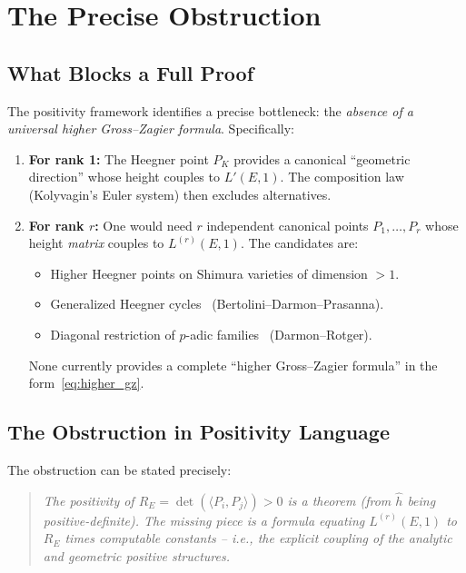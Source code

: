 \documentclass[aps,prd,twocolumn,superscriptaddress,nofootinbib,floatfix]{revtex4-2}
\theoremstyle{definition}
\theoremstyle{remark}
\begin{document}
\clearpage
\section{The Precise Obstruction}
\label{sec:obstruction}

\subsection{What Blocks a Full Proof}

The positivity framework identifies a precise bottleneck: the \textit{absence of a universal higher Gross--Zagier formula}. Specifically:

\begin{enumerate}
\item \textbf{For rank 1:} The Heegner point $P_K$ provides a canonical ``geometric direction'' whose height couples to $L'(E,1)$. The composition law (Kolyvagin's Euler system) then excludes alternatives.

\item \textbf{For rank $r$:} One would need $r$ independent canonical points $P_1, \ldots, P_r$ whose height \textit{matrix} couples to $L^{(r)}(E,1)$. The candidates are:
\begin{itemize}
\item Higher Heegner points on Shimura varieties of dimension $> 1$.
\item Generalized Heegner cycles~\cite{BDP2013} (Bertolini--Darmon--Prasanna).
\item Diagonal restriction of $p$-adic families~\cite{DarmonRotger2017} (Darmon--Rotger).
\end{itemize}
None currently provides a complete ``higher Gross--Zagier formula'' in the form~\eqref{eq:higher_gz}.
\end{enumerate}

\subsection{The Obstruction in Positivity Language}

The obstruction can be stated precisely:

\begin{quote}
\textit{The positivity of $R_E = \det(\langle P_i, P_j \rangle) > 0$ is a theorem (from $\hat{h}$ being positive-definite). The missing piece is a formula equating $L^{(r)}(E,1)$ to $R_E$ times computable constants -- i.e., the explicit coupling of the analytic and geometric positive structures.}
\end{quote}
\end{document}
